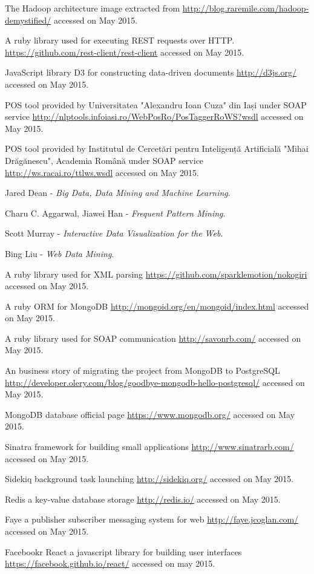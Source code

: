 \begin{thebibliography}{99999}
\singlespace\normalsize

 The Hadoop architecture image extracted from \url{http://blog.raremile.com/hadoop-demystified/} accessed on May 2015.

 A ruby library used for executing REST requests over HTTP. \url{https://github.com/rest-client/rest-client} accessed on May 2015.

 JavaScript library D3 for constructing data-driven documents \url{http://d3js.org/} accessed on May 2015.

 POS tool provided by Universitatea "Alexandru Ioan Cuza" din Iași under SOAP service \url{http://nlptools.infoiasi.ro/WebPosRo/PosTaggerRoWS?wsdl} accessed on May 2015.

 POS tool provided by Institutul de Cercetări pentru Inteligență Artificială "Mihai Drăgănescu", Academia Română under SOAP service \url{http://ws.racai.ro/ttlws.wsdl} accessed on May 2015.

 Jared Dean - \emph{Big Data, Data Mining and Machine Learning}.

 Charu C. Aggarwal, Jiawei Han - \emph{Frequent Pattern Mining}.

 Scott Murray - \emph{Interactive Data Visualization for the Web}.

 Bing Liu - \emph{Web Data Mining}.

 A ruby library used for XML parsing \url{https://github.com/sparklemotion/nokogiri} accessed on May 2015.

 A ruby ORM for MongoDB \url{http://mongoid.org/en/mongoid/index.html} accessed on May 2015.

 A ruby library used for SOAP communication \url{http://savonrb.com/} accessed on May 2015.

 An business story of migrating the project from MongoDB to PostgreSQL \url{http://developer.olery.com/blog/goodbye-mongodb-hello-postgresql/} accessed on May 2015.

 MongoDB database official page \url{https://www.mongodb.org/} accessed on May 2015.

 Sinatra framework for building small applications \url{http://www.sinatrarb.com/} accessed on May 2015.

 Sidekiq background task launching \url{http://sidekiq.org/} accessed on May 2015.

 Redis a key-value database storage \url{http://redis.io/} accessed on May 2015.

 Faye a publisher subscriber messaging system for web \url{http://faye.jcoglan.com/} accessed on May 2015.

 Facebookr React a javascript library for building user interfaces \url{https://facebook.github.io/react/} accessed on may 2015.

\end{thebibliography}
